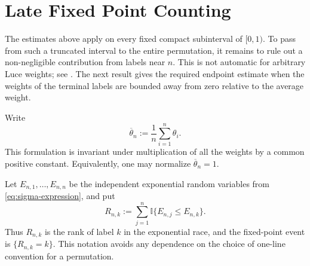 \documentclass[10pt]{article}
\numberwithin{equation}{section}
\begin{document}

\section{Late Fixed Point Counting}\label{sec:late-fixed-point}

The estimates above apply on every fixed compact subinterval of $[0,1)$.
To pass from such a truncated interval to the entire permutation, it remains
to rule out a non-negligible contribution from labels near $n$.  This is not
automatic for arbitrary Luce weights; see
\cite{borga2025permutonlocallimitsluce}.  The next result gives the required
endpoint estimate when the weights of the terminal labels are bounded away
from zero relative to the average weight.

Write
\begin{equation}\label{eq:average-weight}
    \overline\theta_n:=\frac{1}{n}\sum_{i=1}^n\theta_i.
\end{equation}
This formulation is invariant under multiplication of all the weights by a
common positive constant.  Equivalently, one may normalize
$\overline\theta_n=1$.

Let $E_{n,1},\ldots,E_{n,n}$ be the independent exponential random variables
from \eqref{eq:sigma-expression}, and put
\begin{equation}\label{eq:rank-variable}
    R_{n,k}:=\sum_{j=1}^n\mathbb I\{E_{n,j}\leq E_{n,k}\}.
\end{equation}
Thus $R_{n,k}$ is the rank of label $k$ in the exponential race, and the
fixed-point event is $\{R_{n,k}=k\}$.  This notation avoids any dependence on
the choice of one-line convention for a permutation.
\end{document}
